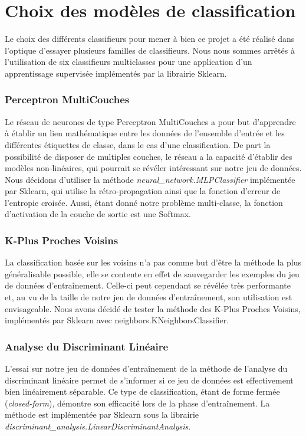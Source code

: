 \section{Choix des modèles de classification}
Le choix des différents classifieurs pour mener à bien ce projet a été réalisé dans l'optique d'essayer plusieurs familles de classifieurs. Nous nous sommes arrêtés à l'utilisation de six classifieurs multiclasses pour une application d'un apprentissage supervisée implémentés par la librairie Sklearn.

\subsubsection*{Perceptron MultiCouches}
Le réseau de neurones de type Perceptron MultiCouches a pour but d'apprendre à établir un lien mathématique entre les données de l'ensemble d'entrée et les différentes étiquettes de classe, dans le cas d'une classification. De part la possibilité de disposer de multiples couches, le réseau a la capacité d'établir des modèles non-linéaires, qui pourrait se révéler intéressant sur notre jeu de données. Nous décidons d'utiliser la méthode \emph{neural\_network.MLPClassifier} implémentée par Sklearn, qui utilise la rétro-propagation ainsi que la fonction d'erreur de l'entropie croisée. Aussi, étant donné notre problème multi-classe, la fonction d'activation de la couche de sortie est une Softmax.

\subsubsection*{K-Plus Proches Voisins}
La classification basée sur les voisins n'a pas comme but d'être la méthode la plus généralisable possible, elle se contente en effet de sauvegarder les exemples du jeu de données d'entraînement. Celle-ci peut cependant se révélée très performante et, au vu de la taille de notre jeu de données d'entraînement, son utilisation est envisageable.
Nous avons décidé de tester la méthode des K-Plus Proches Voisins, implémentés par Sklearn avec neighbors.KNeighborsClassifier.

\subsubsection*{Analyse du Discriminant Linéaire}
L'essai sur notre jeu de données d'entraînement de la méthode de l'analyse du discriminant linéaire permet de s'informer si ce jeu de données est effectivement bien linéairement séparable. Ce type de classification, étant de forme fermée (\emph{closed-form}), démontre son efficacité lors de la phase d'entraînement. La méthode est implémentée par Sklearn sous la librairie \emph{discriminant\_analysis.LinearDiscriminantAnalysis}.

